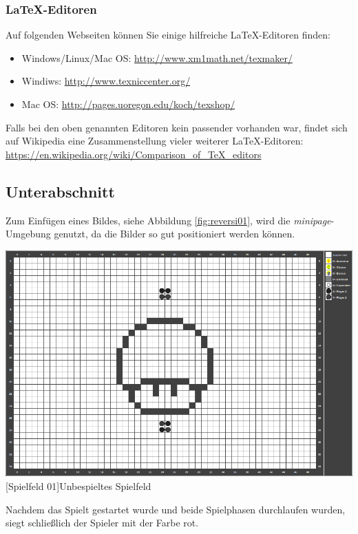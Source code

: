 \documentclass[12pt,a4paper,bibliography=totocnumbered,listof=totocnumbered]{article}
\begin{document}
\subsubsection{\LaTeX-Editoren}
Auf folgenden Webseiten können Sie einige hilfreiche \LaTeX-Editoren finden:
\begin{itemize}
  \item Windows/Linux/Mac OS: \url{http://www.xm1math.net/texmaker/}
  \item Windiws: \url{http://www.texniccenter.org/}
  \item Mac OS: \url{http://pages.uoregon.edu/koch/texshop/}
\end{itemize}

Falls bei den oben genannten Editoren kein passender vorhanden war, findet sich auf Wikipedia eine Zusammenstellung vieler weiterer \LaTeX-Editoren:\\[1em]
\hspace*{3cm}\url{https://en.wikipedia.org/wiki/Comparison_of_TeX_editors}


\subsection{Unterabschnitt}\label{Kap:Minipage}
Zum Einfügen eines Bildes, siehe Abbildung \ref{fig:reversi01}, wird die \textit{minipage}-Umgebung genutzt, da die Bilder so gut positioniert werden können.

\vspace{1em}
\begin{minipage}{\linewidth}
	\centering
	\includegraphics[width=0.6\linewidth]{pics/gamefield01.png}
	[Spielfeld 01]{Unbespieltes Spielfeld\footnotemark }
	\label{fig:reversi01}
\end{minipage}

Nachdem das Spielt gestartet wurde und beide Spielphasen durchlaufen wurden, siegt schließlich der Spieler mit der Farbe rot.
\end{document}
